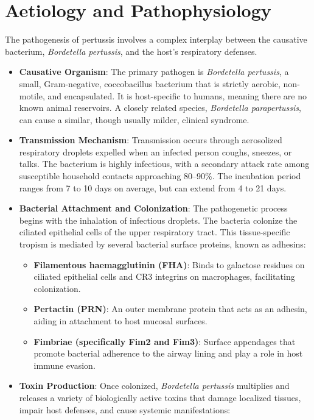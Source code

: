 \section*{Aetiology and Pathophysiology}
The pathogenesis of pertussis involves a complex interplay between the causative bacterium, \textit{Bordetella pertussis}, and the host's respiratory defenses.
\begin{itemize}
    \item \textbf{Causative Organism}: The primary pathogen is \textit{Bordetella pertussis}, a small, Gram-negative, coccobacillus bacterium that is strictly aerobic, non-motile, and encapsulated. It is host-specific to humans, meaning there are no known animal reservoirs. A closely related species, \textit{Bordetella parapertussis}, can cause a similar, though usually milder, clinical syndrome.
    \item \textbf{Transmission Mechanism}: Transmission occurs through aerosolized respiratory droplets expelled when an infected person coughs, sneezes, or talks. The bacterium is highly infectious, with a secondary attack rate among susceptible household contacts approaching 80--90\%. The incubation period ranges from 7 to 10 days on average, but can extend from 4 to 21 days.
    \item \textbf{Bacterial Attachment and Colonization}: The pathogenetic process begins with the inhalation of infectious droplets. The bacteria colonize the ciliated epithelial cells of the upper respiratory tract. This tissue-specific tropism is mediated by several bacterial surface proteins, known as adhesins:
    \begin{itemize}
        \item \textbf{Filamentous haemagglutinin (FHA)}: Binds to galactose residues on ciliated epithelial cells and CR3 integrins on macrophages, facilitating colonization.
        \item \textbf{Pertactin (PRN)}: An outer membrane protein that acts as an adhesin, aiding in attachment to host mucosal surfaces.
        \item \textbf{Fimbriae (specifically Fim2 and Fim3)}: Surface appendages that promote bacterial adherence to the airway lining and play a role in host immune evasion.
    \end{itemize}
    \item \textbf{Toxin Production}: Once colonized, \textit{Bordetella pertussis} multiplies and releases a variety of biologically active toxins that damage localized tissues, impair host defenses, and cause systemic manifestations:

\end{itemize}
